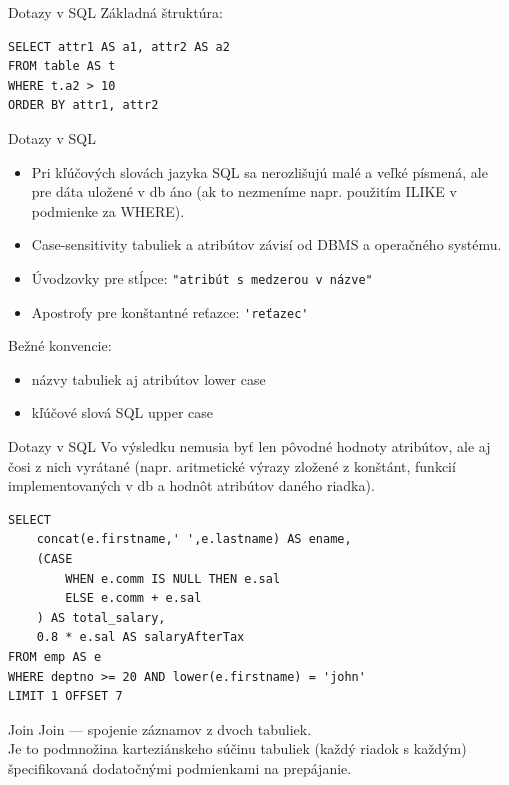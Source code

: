 \documentclass[12pt]{beamer}
\begin{document}
\begin{frame}[fragile]{Dotazy v SQL}
Základná štruktúra:
\begin{verbatim}
SELECT attr1 AS a1, attr2 AS a2
FROM table AS t
WHERE t.a2 > 10
ORDER BY attr1, attr2
\end{verbatim}
\end{frame}

\begin{frame}[fragile]{Dotazy v SQL}
\begin{itemize}
\item Pri kľúčových slovách jazyka SQL sa nerozlišujú malé a veľké písmená,
ale pre dáta uložené v db áno (ak to nezmeníme napr. použitím ILIKE v podmienke za WHERE).
\item Case-sensitivity tabuliek a atribútov závisí od DBMS a operačného systému.
\item Úvodzovky pre stĺpce: \verb|"atribút s medzerou v názve"|
\item Apostrofy pre konštantné reťazce: \verb|'reťazec'|
\end{itemize}

Bežné konvencie:
\begin{itemize}
\item názvy tabuliek aj atribútov lower case
\item kľúčové slová SQL upper case
\end{itemize}
\end{frame}

\begin{frame}[fragile]{Dotazy v SQL}
Vo výsledku nemusia byť len pôvodné hodnoty atribútov, ale aj čosi z nich vyrátané (napr. aritmetické výrazy zložené z konštánt, funkcií implementovaných v db a hodnôt atribútov daného riadka).\\[3mm]

\begin{verbatim}
SELECT 
    concat(e.firstname,' ',e.lastname) AS ename,
    (CASE
        WHEN e.comm IS NULL THEN e.sal
        ELSE e.comm + e.sal
    ) AS total_salary,
    0.8 * e.sal AS salaryAfterTax 
FROM emp AS e
WHERE deptno >= 20 AND lower(e.firstname) = 'john'
LIMIT 1 OFFSET 7
\end{verbatim}
\end{frame}


\begin{frame}{Join}
\alert{Join} --- spojenie záznamov z dvoch tabuliek.\\[3mm]

Je to podmnožina karteziánskeho súčinu tabuliek (každý riadok s každým)
špecifikovaná dodatočnými podmienkami na prepájanie.
\end{frame}
\end{document}
